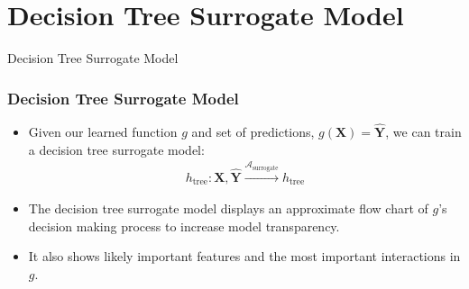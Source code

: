 \section{Decision Tree Surrogate Model}

\begin{frame}[c]
\Huge{\centerline{Decision Tree Surrogate Model}}
\end{frame}


\begin{frame}\frametitle{Decision Tree Surrogate Model}
	\begin{itemize}
		\item Given our learned function $g$ and set of predictions, $g(\mathbf{X}) = \hat{\mathbf{Y}}$, we can train a decision tree surrogate model:
			\begin{equation}
			\begin{aligned}
				h_{\text{tree}}: \mathbf{X},\hat{\mathbf{Y}} \xrightarrow{\mathcal{A}_{\text{surrogate}}} h_{\text{tree}}
			\end{aligned}
			\end{equation}

		\item The decision tree surrogate model displays an approximate flow chart of $g$'s decision making process to increase model transparency.
		\item It also shows likely important features and the most important interactions in $g$. 
		
	\end{itemize}
\end{frame}

